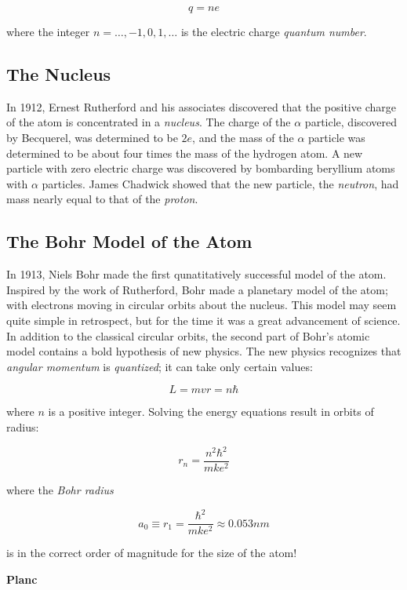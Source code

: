 \begin{equation*}
  q=n e
\end{equation*}

where the integer $n=\dots,-1,0,1,\dots$ is the electric charge
\emph{quantum number}.

\subsection*{The Nucleus}

In 1912, Ernest Rutherford and his associates discovered that the
positive charge of the atom is concentrated in a \emph{nucleus}. The
charge of the $\alpha$ particle, discovered by Becquerel, was
determined to be $2e$, and the mass of the $\alpha$ particle was
determined to be about four times the mass of the hydrogen
atom. \newline
A new particle with zero electric charge was discovered by bombarding
beryllium atoms with $\alpha$ particles. James Chadwick showed that
the new particle, the \emph{neutron}, had mass nearly equal to that of
the \emph{proton}.

\subsection*{The Bohr Model of the Atom}

In 1913, Niels Bohr made the first qunatitatively successful model of
the atom. Inspired by the work of Rutherford, Bohr made a planetary
model of the atom; with electrons moving in circular orbits about the
nucleus. This model may seem quite simple in retrospect, but for the
time it was a great advancement of science. In addition to the
classical circular orbits, the second part of Bohr's atomic model
contains a bold hypothesis of new physics. The new physics recognizes
that \emph{angular momentum} is \emph{quantized}; it can take only
certain values:

\begin{equation*}
  L = mvr = n \hbar
\end{equation*}

where $n$ is a positive integer. Solving the energy equations result
in orbits of radius:

\begin{equation*}
  r_n = \frac{n^2\hbar^2}{mke^2}
\end{equation*}

where the \emph{Bohr radius}

\begin{equation*}
  a_0 \equiv r_1 = \frac{\hbar^2}{mke^2} \approx 0.053 nm
\end{equation*}

is in the correct order of magnitude for the size of the atom!

{\bf Planc }

